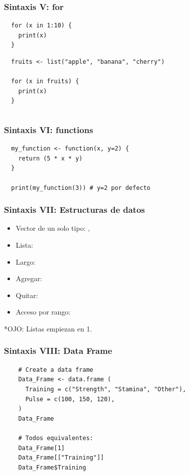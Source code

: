\documentclass[14pt,aspectratio=169,xcolor=dvipsnames]{beamer}
\begin{document}
\begin{frame}[fragile]\frametitle{Sintaxis V: for}
    \begin{verbatim}
  for (x in 1:10) {
    print(x)
  } 
    \end{verbatim}
    \begin{verbatim}
  fruits <- list("apple", "banana", "cherry")

  for (x in fruits) {
    print(x)
  } 
    \end{verbatim}
    \begin{verbatim}
    \end{verbatim}
\end{frame}
\begin{frame}[fragile]\frametitle{Sintaxis VI: functions}
    \begin{verbatim}
  my_function <- function(x, y=2) {
    return (5 * x * y)
  }

  print(my_function(3)) # y=2 por defecto
    \end{verbatim}
\end{frame}
\begin{frame}[fragile]\frametitle{Sintaxis VII: Estructuras de datos}
    \begin{itemize}
        \item Vector de un solo tipo: ,
        \item Lista: 
        \item Largo: 
        \item Agregar: 
        \item Quitar: 
        \item Acceso por rango: 
    \end{itemize}

*OJO: Listas empiezan en 1.
\end{frame}
\begin{frame}[fragile]\frametitle{Sintaxis VIII: Data Frame}
    \begin{verbatim}
    # Create a data frame
    Data_Frame <- data.frame (
      Training = c("Strength", "Stamina", "Other"),
      Pulse = c(100, 150, 120),
    )
    Data_Frame 

    # Todos equivalentes: 
    Data_Frame[1]
    Data_Frame[["Training"]]
    Data_Frame$Training 
    \end{verbatim}
\end{frame}
\end{document}
